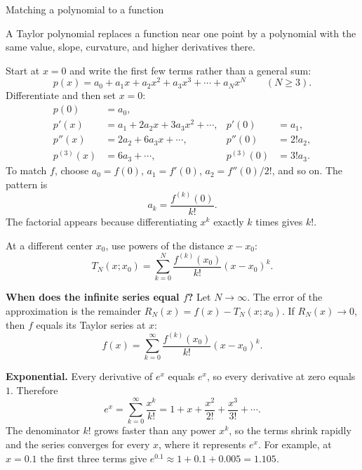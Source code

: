 \documentclass[11pt]{beamer}
\begin{document}
\begin{frame}[allowframebreaks=1.00]{Matching a polynomial to a function}
\footnotesize

A Taylor polynomial replaces a function near one point by a polynomial with the
same value, slope, curvature, and higher derivatives there.

Start at $x=0$ and write the first few terms rather than a general sum:
\[
 p(x)=a_0+a_1x+a_2x^2+a_3x^3+\cdots+a_Nx^N\qquad(N\ge3).
\]
Differentiate and then set $x=0$:
\begin{align*}
 p(0)&=a_0,\\
 p'(x)&=a_1+2a_2x+3a_3x^2+\cdots,
       &p'(0)&=a_1,\\
 p''(x)&=2a_2+6a_3x+\cdots,
       &p''(0)&=2!a_2,\\
 p^{(3)}(x)&=6a_3+\cdots,
       &p^{(3)}(0)&=3!a_3.
\end{align*}
To match $f$, choose $a_0=f(0)$, $a_1=f'(0)$, $a_2=f''(0)/2!$, and so on.
The pattern is
\begin{equation}
 a_k=\frac{f^{(k)}(0)}{k!}.
 \label{eq:taylor-coef}
\end{equation}
The factorial appears because differentiating $x^k$ exactly $k$ times gives $k!$.


At a different center $x_0$, use powers of the distance $x-x_0$:
\begin{equation}
 T_N(x;x_0)=\sum_{k=0}^{N}\frac{f^{(k)}(x_0)}{k!}(x-x_0)^k.
 \label{eq:taylorx0}
\end{equation}


\textbf{When does the infinite series equal \(f\)?} Let \(N\to\infty\). The error of the
approximation is the remainder \(R_N(x)=f(x)-T_N(x;x_0)\). If \(R_N(x)\to0\), then \(f\) equals its
Taylor series at \(x\):
\begin{equation}
 f(x)=\sum_{k=0}^{\infty}\frac{f^{(k)}(x_0)}{k!}(x-x_0)^k.
 \label{eq:taylor0}
\end{equation}




\textbf{Exponential.} Every derivative of $e^x$ equals $e^x$, so every derivative at
zero equals $1$. Therefore
\begin{equation}
 e^x=\sum_{k=0}^{\infty}\frac{x^k}{k!}
 =1+x+\frac{x^2}{2!}+\frac{x^3}{3!}+\cdots.
 \label{eq:exp-series}
\end{equation}
The denominator $k!$ grows faster than any power $x^k$, so the terms shrink rapidly
and the series converges for every $x$, where it represents $e^x$.
For example, at $x=0.1$ the first three terms give
$e^{0.1}\approx1+0.1+0.005=1.105$.



\end{frame}
\end{document}
